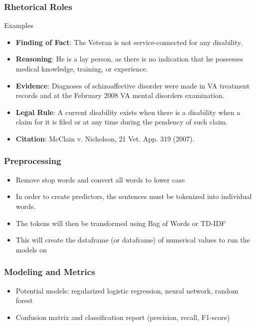 \documentclass{beamer}
\begin{document}
\begin{frame}
  \frametitle{Rhetorical Roles}
  \footnotesize
  Examples
  \begin{itemize}
  \item \textbf{Finding of Fact}: The Veteran is not service-connected for any disability.
  \item \textbf{Reasoning}: He is a lay person, as there is no indication that he possesses medical knowledge, training, or experience.
  \item \textbf{Evidence}: Diagnoses of schizoaffective disorder were made in VA treatment records and at the February 2008 VA mental disorders examination.
  \item \textbf{Legal Rule}: A current disability exists when there is a disability when a claim for it is filed or at any time during the pendency of such claim.
  \item \textbf{Citation}: McClain v. Nicholson, 21 Vet. App. 319 (2007).
  \end{itemize}
\end{frame}


\begin{frame}
  \frametitle{Preprocessing}
   \footnotesize
  \begin{itemize}
  \item Remove stop words and convert all words to lower case
  \item In order to create predictors, the sentences must be tokenized into individual words.
    \item The tokens will then be transformed using Bag of Words or TD-IDF
      \item This will create the dataframe (or dataframe) of numerical values to run the models on
  \end{itemize}
\end{frame}

\begin{frame}
  \frametitle{Modeling and Metrics}
  \begin{itemize}
    \item Potential models: regularized logistic regression, neural network, random forest
      \item Confusion matrix and classification report (precision, recall, F1-score)
  \end{itemize}

  \end{frame}
\end{document}
